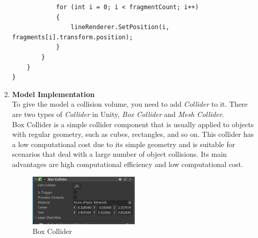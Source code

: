\documentclass[12pt]{article}
\begin{document}
\begin{enumerate}
\begin{verbatim}
            for (int i = 0; i < fragmentCount; i++)
            {
                lineRenderer.SetPosition(i, fragments[i].transform.position);
            }
        }
    }
}
      \end{verbatim}
      \item \textbf{Model Implementation}
      \\
      To give the model a collision volume, you need to add \emph{Collider} to it. There are two types of \emph{Collider} in Unity, \emph{Box Collider} and \emph{Mesh Collider}.
      \\
      Box Collider is a simple collider component that is usually applied to objects with regular geometry, such as cubes, rectangles, and so on. This collider has a low computational cost due to its simple geometry and is suitable for scenarios that deal with a large number of object collisions. Its main advantages are high computational efficiency and low computational cost. \cite{UnityBoxCollider2024}
      \begin{figure}[H]
            \centering
            \includegraphics[width=0.5\textwidth]{box.png}
            \caption{Box Collider}
      \end{figure}
     

\end{enumerate}
\end{document}
